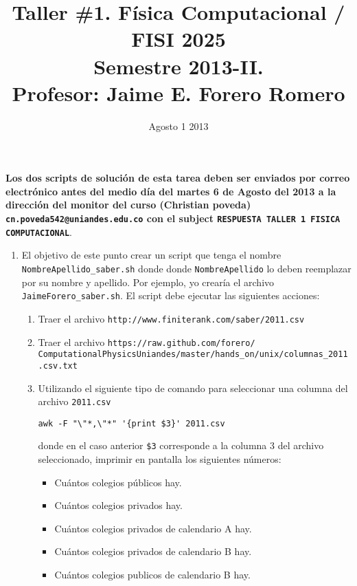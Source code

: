\documentclass{article}
\title{Taller \#1. F\'isica Computacional / FISI 2025 \\Semestre 2013-II. \\ Profesor: Jaime E. Forero Romero}
\date{Agosto 1 2013}
\begin{document}
\maketitle

{\bf Los dos scripts de soluci\'on de esta tarea deben ser enviados por correo electr\'onico antes del medio d\'ia del martes 6 de Agosto del 2013 a la direcci\'on del monitor del curso (Christian poveda) {\texttt{cn.poveda542@uniandes.edu.co}} con el subject \verb"RESPUESTA TALLER 1 FISICA COMPUTACIONAL"}.

\begin{enumerate}

\item
El objetivo de este punto crear un script que tenga el nombre \verb"NombreApellido_saber.sh" donde donde \verb"NombreApellido" lo deben reemplazar por su nombre y apellido. Por ejemplo, yo crear\'ia el archivo \verb"JaimeForero_saber.sh". El script debe ejecutar las siguientes acciones:

\begin{enumerate}
\item 
Traer el archivo  \verb"http://www.finiterank.com/saber/2011.csv"
\item
Traer el archivo \verb"https://raw.github.com/forero/"\newline
\verb"ComputationalPhysicsUniandes/master/hands_on/unix/columnas_2011.csv.txt"
\item

  Utilizando el siguiente tipo de comando para seleccionar una columna del archivo \verb"2011.csv"
\begin{verbatim}
awk -F "\"*,\"*" '{print $3}' 2011.csv
\end{verbatim}
donde en el caso anterior \verb"$3" corresponde a la columna 3 del archivo seleccionado, imprimir en pantalla los siguientes n\'umeros:
\begin{itemize}
\item Cu\'antos colegios p\'ublicos hay.
\item Cu\'antos colegios privados hay.
\item Cu\'antos colegios privados de calendario A hay.
\item Cu\'antos colegios privados de calendario B hay.
\item Cu\'antos colegios publicos de calendario B hay.
\end{itemize}



\end{enumerate}
\end{enumerate}
\end{document}
